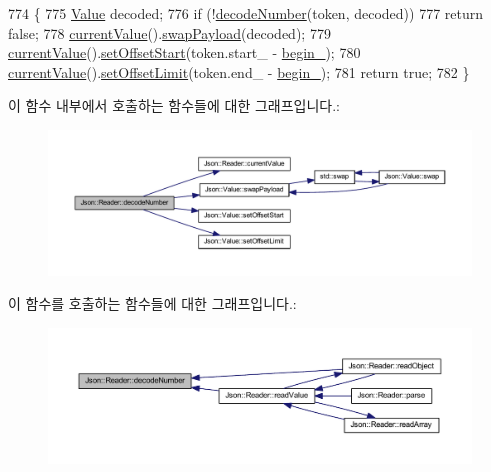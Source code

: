 \begin{DoxyCode}
774                                       \{
775   \hyperlink{class_json_1_1_value}{Value} decoded;
776   \textcolor{keywordflow}{if} (!\hyperlink{class_json_1_1_reader_a442d1f23edf0f4350f5eeab3ee3f7d46}{decodeNumber}(token, decoded))
777     \textcolor{keywordflow}{return} \textcolor{keyword}{false};
778   \hyperlink{class_json_1_1_reader_a85597f763fb0148a17359b6dfc6f7326}{currentValue}().\hyperlink{class_json_1_1_value_a5263476047f20e2fc6de470e4de34fe5}{swapPayload}(decoded);
779   \hyperlink{class_json_1_1_reader_a85597f763fb0148a17359b6dfc6f7326}{currentValue}().\hyperlink{class_json_1_1_value_a92e32ea0f4f8a15853a3cf0beac9feb9}{setOffsetStart}(token.start\_ - \hyperlink{class_json_1_1_reader_a327166839022ea91f0a8290960a8af76}{begin\_});
780   \hyperlink{class_json_1_1_reader_a85597f763fb0148a17359b6dfc6f7326}{currentValue}().\hyperlink{class_json_1_1_value_a5e4f5853fec138150c5df6004a8c2bcf}{setOffsetLimit}(token.end\_ - \hyperlink{class_json_1_1_reader_a327166839022ea91f0a8290960a8af76}{begin\_});
781   \textcolor{keywordflow}{return} \textcolor{keyword}{true};
782 \}
\end{DoxyCode}
이 함수 내부에서 호출하는 함수들에 대한 그래프입니다.\+:\nopagebreak
\begin{figure}[H]
\begin{center}
\leavevmode
\includegraphics[width=350pt]{class_json_1_1_reader_a442d1f23edf0f4350f5eeab3ee3f7d46_cgraph}
\end{center}
\end{figure}
이 함수를 호출하는 함수들에 대한 그래프입니다.\+:\nopagebreak
\begin{figure}[H]
\begin{center}
\leavevmode
\includegraphics[width=350pt]{class_json_1_1_reader_a442d1f23edf0f4350f5eeab3ee3f7d46_icgraph}
\end{center}
\end{figure}
\mbox{\label{class_json_1_1_reader_a72f426ce3fa384d14aa10e9dd75618f0}} 
